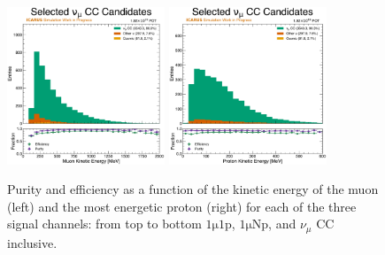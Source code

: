 \begin{figure}[!htb]
    \\
    \includegraphics[width=0.42\textwidth]{figures/neutrino_selection/selected_hist1d_1muX_muon_ke.pdf}
    \includegraphics[width=0.42\textwidth]{figures/neutrino_selection/selected_hist1d_1muX_proton_ke.pdf}
    \caption{Purity and efficiency as a function of the kinetic energy of the muon (left) and the most energetic proton (right) for each of the three signal channels: from top to bottom $\mathrm{1\mu 1p}$, $\mathrm{1\mu Np}$, and $\nu_\mu$ CC inclusive.}
    \label{fig:pureff_muon_proton_ke}
\end{figure}

